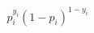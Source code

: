 \documentclass[preview]{standalone}
\begin{document}
\begin{align*}
p_i ^{y_i}(1-p_i)^{1-y_i}
\end{align*}
\end{document}
